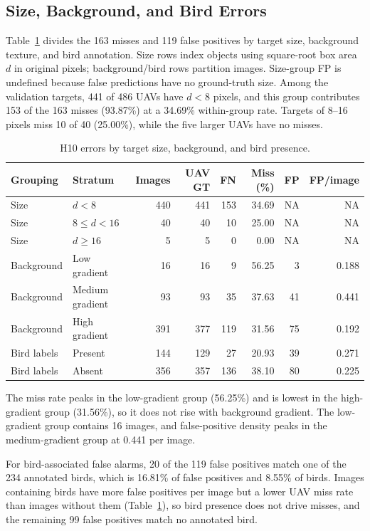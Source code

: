 \documentclass[lettersize,journal]{IEEEtran}
\begin{document}
\subsection{Size, Background, and Bird Errors}
Table~\ref{tab:errors} divides the 163 misses and 119 false positives by target size, background texture, and bird annotation. Size rows index objects using square-root box area $d$ in original pixels; background/bird rows partition images. Size-group FP is undefined because false predictions have no ground-truth size. Among the validation targets, 441 of 486 UAVs have $d<8$ pixels, and this group contributes 153 of the 163 misses (93.87\%) at a 34.69\% within-group rate. Targets of 8--16 pixels miss 10 of 40 (25.00\%), while the five larger UAVs have no misses.
\begin{table}[!t]
\caption{H10 errors by target size, background, and bird presence.}
\label{tab:errors}
\centering\footnotesize
\setlength{\tabcolsep}{5pt}
\begin{tabular}{llrrrrrr}
\hline
Grouping & Stratum & Images & UAV GT & FN & Miss (\%) & FP & FP/image\\
\hline
Size & $d<8$ & 440 & 441 & 153 & 34.69 & NA & NA\\
Size & $8\leq d<16$ & 40 & 40 & 10 & 25.00 & NA & NA\\
Size & $d\geq16$ & 5 & 5 & 0 & 0.00 & NA & NA\\
Background & Low gradient & 16 & 16 & 9 & 56.25 & 3 & 0.188\\
Background & Medium gradient & 93 & 93 & 35 & 37.63 & 41 & 0.441\\
Background & High gradient & 391 & 377 & 119 & 31.56 & 75 & 0.192\\
Bird labels & Present & 144 & 129 & 27 & 20.93 & 39 & 0.271\\
Bird labels & Absent & 356 & 357 & 136 & 38.10 & 80 & 0.225\\
\hline
\end{tabular}
\end{table}

The miss rate peaks in the low-gradient group (56.25\%) and is lowest in the high-gradient group (31.56\%), so it does not rise with background gradient. The low-gradient group contains 16 images, and false-positive density peaks in the medium-gradient group at 0.441 per image.

For bird-associated false alarms, 20 of the 119 false positives match one of the 234 annotated birds, which is 16.81\% of false positives and 8.55\% of birds. Images containing birds have more false positives per image but a lower UAV miss rate than images without them (Table~\ref{tab:errors}), so bird presence does not drive misses, and the remaining 99 false positives match no annotated bird.
\end{document}
